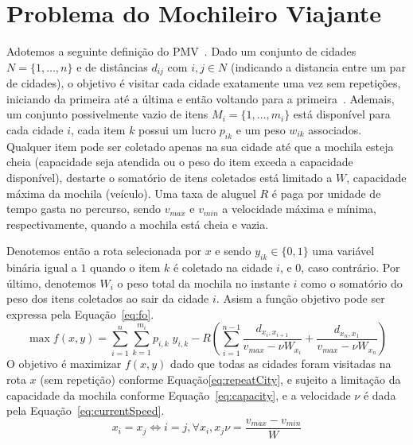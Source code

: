 \section{Problema do Mochileiro Viajante}\label{sec:ttp}

Adotemos a seguinte definição do PMV~\cite{Polyakovskiy:2014}. Dado um conjunto de cidades $ N = \{1, \dots, n\} $ e de distâncias $d_{ij}$ com $i, j \in N $ (indicando a distancia entre um par de cidades), o objetivo é visitar cada cidade exatamente uma vez sem repetições, iniciando da primeira até a última e então voltando para a primeira~\cite{Bonyadi:2013}.
Ademais, um conjunto possivelmente vazio de itens $ M_i = \{1, \dots, m_i\} $ está disponível para cada cidade $i$, cada item $k$ possui um lucro $p_{ik}$ e um peso $w_{ik}$ associados. Qualquer item pode ser coletado apenas na sua cidade até que a mochila esteja cheia (capacidade seja atendida ou o peso do item exceda a capacidade disponível), destarte o somatório de itens coletados está limitado a $W$, capacidade máxima da mochila (veículo).
Uma taxa de aluguel $R$ é paga por unidade de tempo gasta no percurso, sendo $v_{max}$ e $v_{min}$ a velocidade máxima e mínima, respectivamente, quando a mochila está cheia e vazia.

Denotemos então a rota selecionada por $x$ e sendo $y_{ik} \in \{0, 1\}$ uma variável binária igual a $1$ quando o item $k$ é coletado na cidade $i$, e $0$, caso contrário. Por último, denotemos $W_i$ o peso total da mochila no instante $i$ como o somatório do peso dos itens coletados ao sair da cidade $i$. Asism a função objetivo pode ser expressa pela Equação~\eqref{eq:fo}.
%
\begin{equation} \label{eq:fo}
\max f(x, y) = \sum\limits_{i=1}^n\sum\limits_{k = 1}^{m_i} p_{i,k}\;y_{i,k} - R
\left(
\sum\limits_{i = 1}^{n - 1}\frac{d_{x_i , x_{i+1}}}{v_{max} - \nu W_{x_i}} +
\frac{d_{x_n , x_1}}{v_{max} - \nu W_{x_n}}
\right)
\end{equation}
% 
O objetivo é maximizar $f(x, y)$ dado que todas as cidades foram visitadas na rota $x$ (sem repetição) conforme Equação\ref{eq:repeatCity}, e sujeito a limitação da capacidade da mochila conforme Equação~\eqref{eq:capacity}, e a velocidade $\nu$ é dada pela Equação~\eqref{eq:currentSpeed}.
\begin{equation} \label{eq:repeatCity}
x_i = x_j \iff i = j, \forall x_i,x_j
\nu = \frac{v_{max} - v_{min}}{W}
\end{equation}

